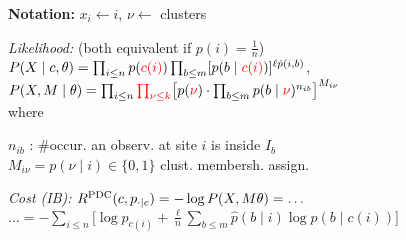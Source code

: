 \textbf{Notation:}\enspace
$x_i \leftarrow i$, \enskip
{} \enskip
$\nu \leftarrow$ clusters

\emph{Likelihood:}\enspace
(both equivalent if $p(i)=\frac1n$)\\
\enspace $P(X\mid c,\theta) = \prod_{i\leq n} p(\textcolor{red}{c(i)}) \prod_{b\leq m} [p(b\mid \textcolor{red}{c(i)})]^{\ell \hat p(i,b)}$,\\
\enspace $P(X,M\mid \theta) = \prod_{i\leq n} \textcolor{red}{\prod_{\nu\leq k}} \big[ p(\textcolor{red}{\nu}) \cdot \prod_{b\leq m} p(b\mid\textcolor{red}{\nu})^{n_{ib}} \big]^{M_{i\nu}}$
\\
where\enskip
\begin{minipage}[t]{\linewidth-\widthof{where\enskip}}
    $n_{ib}$ : \#occur. an observ. at site $i$ is inside $I_b$ \\
    $M_{i\nu} = p(\nu\mid i) \in \{0,1\}$ \enskip clust. membersh. assign.
\end{minipage}

\emph{Cost (IB):}\enspace
$R^\mathrm{PDC}(c, p_{\cdot\mid c}) = -\log P(X,M\theta) = \ldots$
\hfill $\ldots = -\sum_{i\leq n} \big[ \log p_{c(i)} + \frac{\ell}{n} \sum_{b\leq m} \hat p(b\mid i) \log p(b\mid c(i)) \big]$\\


